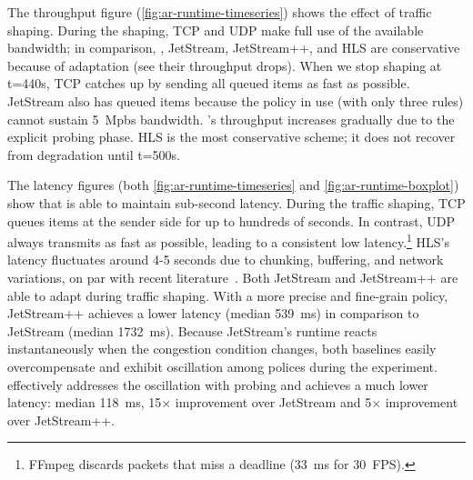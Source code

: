 The throughput figure (\autoref{fig:ar-runtime-timeseries}) shows the effect of
traffic shaping. During the shaping, TCP and UDP make full use of the available
bandwidth; in comparison, \awstream{}, JetStream, JetStream++, and HLS are
conservative because of adaptation (see their throughput drops). When we stop
shaping at t=440s, TCP catches up by sending all queued items as fast as
possible. JetStream also has queued items because the policy in use (with only
three rules) cannot sustain \SI{5}{Mpbs} bandwidth. \awstream{}'s throughput
increases gradually due to the explicit probing phase. HLS is the most
conservative scheme; it does not recover from degradation until t=500s.


The latency figures (both \autoref{fig:ar-runtime-timeseries} and
\autoref{fig:ar-runtime-boxplot}) show that \awstream{} is able to maintain
sub-second latency. During the traffic shaping, TCP queues items at the sender
side for up to hundreds of seconds. In contrast, UDP always transmits as fast as
possible, leading to a consistent low latency.\footnote{FFmpeg discards packets
  that miss a deadline (\SI{33}{\ms} for \SI{30}{FPS}).} HLS's latency
fluctuates around 4-5 seconds due to chunking, buffering, and network
variations, on par with recent literature~\cite{wang2016anatomy}. Both JetStream
and JetStream++ are able to adapt during traffic shaping. With a more precise
and fine-grain policy, JetStream++ achieves a lower latency (median
\SI{539}{\ms}) in comparison to JetStream (median \SI{1732}{\ms}). Because
JetStream's runtime reacts instantaneously when the congestion condition
changes, both baselines easily overcompensate and exhibit oscillation among
polices during the experiment. \awstream{} effectively addresses the oscillation
with probing and achieves a much lower latency: median \SI{118}{\ms}, 15$\times$
improvement over JetStream and 5$\times$ improvement over JetStream++.

